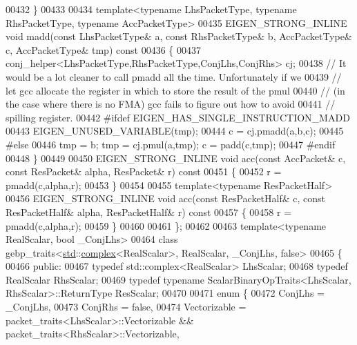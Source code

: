 \begin{DoxyCode}
00432   \}
00433 
00434   \textcolor{keyword}{template}<\textcolor{keyword}{typename} LhsPacketType, \textcolor{keyword}{typename} RhsPacketType, \textcolor{keyword}{typename} AccPacketType>
00435   EIGEN\_STRONG\_INLINE \textcolor{keywordtype}{void} madd(\textcolor{keyword}{const} LhsPacketType& a, \textcolor{keyword}{const} RhsPacketType& b, AccPacketType& c, 
      AccPacketType& tmp)\textcolor{keyword}{ const}
00436 \textcolor{keyword}{  }\{
00437     conj\_helper<LhsPacketType,RhsPacketType,ConjLhs,ConjRhs> cj;
00438     \textcolor{comment}{// It would be a lot cleaner to call pmadd all the time. Unfortunately if we}
00439     \textcolor{comment}{// let gcc allocate the register in which to store the result of the pmul}
00440     \textcolor{comment}{// (in the case where there is no FMA) gcc fails to figure out how to avoid}
00441     \textcolor{comment}{// spilling register.}
00442 \textcolor{preprocessor}{#ifdef EIGEN\_HAS\_SINGLE\_INSTRUCTION\_MADD}
00443     EIGEN\_UNUSED\_VARIABLE(tmp);
00444     c = cj.pmadd(a,b,c);
00445 \textcolor{preprocessor}{#else}
00446     tmp = b; tmp = cj.pmul(a,tmp); c = padd(c,tmp);
00447 \textcolor{preprocessor}{#endif}
00448   \}
00449 
00450   EIGEN\_STRONG\_INLINE \textcolor{keywordtype}{void} acc(\textcolor{keyword}{const} AccPacket& c, \textcolor{keyword}{const} ResPacket& alpha, ResPacket& r)\textcolor{keyword}{ const}
00451 \textcolor{keyword}{  }\{
00452     r = pmadd(c,alpha,r);
00453   \}
00454   
00455   \textcolor{keyword}{template}<\textcolor{keyword}{typename} ResPacketHalf>
00456   EIGEN\_STRONG\_INLINE \textcolor{keywordtype}{void} acc(\textcolor{keyword}{const} ResPacketHalf& c, \textcolor{keyword}{const} ResPacketHalf& alpha, ResPacketHalf& r)\textcolor{keyword}{ const}
00457 \textcolor{keyword}{  }\{
00458     r = pmadd(c,alpha,r);
00459   \}
00460 
00461 \};
00462 
00463 \textcolor{keyword}{template}<\textcolor{keyword}{typename} RealScalar, \textcolor{keywordtype}{bool} \_ConjLhs>
00464 \textcolor{keyword}{class }gebp\_traits<\hyperlink{namespacestd}{std}::\hyperlink{structcomplex}{complex}<RealScalar>, RealScalar, \_ConjLhs, false>
00465 \{
00466 \textcolor{keyword}{public}:
00467   \textcolor{keyword}{typedef} std::complex<RealScalar> LhsScalar;
00468   \textcolor{keyword}{typedef} RealScalar RhsScalar;
00469   \textcolor{keyword}{typedef} \textcolor{keyword}{typename} ScalarBinaryOpTraits<LhsScalar, RhsScalar>::ReturnType ResScalar;
00470 
00471   \textcolor{keyword}{enum} \{
00472     ConjLhs = \_ConjLhs,
00473     ConjRhs = \textcolor{keyword}{false},
00474     Vectorizable = packet\_traits<LhsScalar>::Vectorizable && packet\_traits<RhsScalar>::Vectorizable,

\end{DoxyCode}

